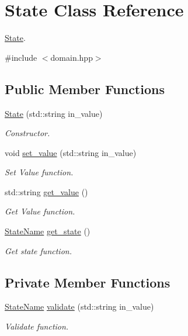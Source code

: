 \hypertarget{classState}{}\section{State Class Reference}
\label{classState}


\hyperlink{classState}{State}.  




{\ttfamily \#include $<$domain.\+hpp$>$}

\subsection*{Public Member Functions}
\begin{DoxyCompactItemize}
\item 
\hyperlink{classState_ae9cf5ecda4efd589235426b54c9a239a}{State} (std\+::string in\+\_\+value)
\begin{DoxyCompactList}\small\item\em Constructor. \end{DoxyCompactList}\item 
void \hyperlink{classState_aa1a10a6dd9759136990a233421333f05}{set\+\_\+value} (std\+::string in\+\_\+value)
\begin{DoxyCompactList}\small\item\em Set Value function. \end{DoxyCompactList}\item 
std\+::string \hyperlink{classState_ae6687923a152552269e6edf7f172d679}{get\+\_\+value} ()
\begin{DoxyCompactList}\small\item\em Get Value function. \end{DoxyCompactList}\item 
\hyperlink{domain_8hpp_ac99446a312a3e7b8497ac6ec1f3ae080}{State\+Name} \hyperlink{classState_a33798fb28dd9e3ddd15209732c4d955b}{get\+\_\+state} ()
\begin{DoxyCompactList}\small\item\em Get state function. \end{DoxyCompactList}\end{DoxyCompactItemize}
\subsection*{Private Member Functions}
\begin{DoxyCompactItemize}
\item 
\hyperlink{domain_8hpp_ac99446a312a3e7b8497ac6ec1f3ae080}{State\+Name} \hyperlink{classState_a925750e8bf57037601e018ab7feee205}{validate} (std\+::string in\+\_\+value)
\begin{DoxyCompactList}\small\item\em Validate function. \end{DoxyCompactList}\end{DoxyCompactItemize}
